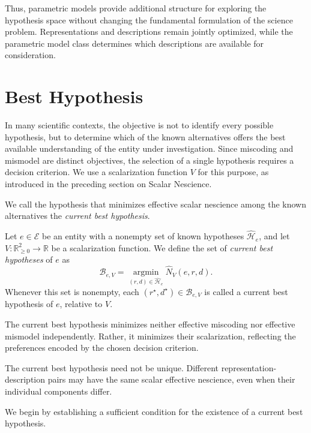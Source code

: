 Thus, parametric models provide additional structure for exploring the hypothesis space without changing the fundamental formulation of the science problem. Representations and descriptions remain jointly optimized, while the parametric model class determines which descriptions are available for consideration.

%
%

\section{Best Hypothesis}

In many scientific contexts, the objective is not to identify every possible hypothesis, but to determine
which of the known alternatives offers the best available understanding of the entity under investigation. Since miscoding and mismodel are distinct objectives, the selection of a single hypothesis requires a decision criterion. We use a scalarization function $V$ for this purpose, as introduced in the preceding section on Scalar Nescience.

We call the hypothesis that minimizes effective scalar nescience among the known alternatives the \emph{current best hypothesis}.

\begin{definition}
Let $e\in\mathcal E$ be an entity with a nonempty set of known hypotheses $\widehat{\mathcal H}_e$, and let $V:\mathbb R_{\geq0}^2\to\mathbb R$ be a scalarization function. We define the set of \emph{current best hypotheses}  of $e$ as
\[
\mathcal B_{e,V} = \operatorname*{argmin}_{ (r,d)\in\widehat{\mathcal H}_e} \widehat N_V(e,r,d).
\]
Whenever this set is nonempty, each $(r^\star,d^\star)\in\mathcal B_{e,V}$ is called a current best hypothesis of $e$, relative to $V$.
\end{definition}

The current best hypothesis minimizes neither effective miscoding nor effective mismodel independently. Rather, it minimizes their scalarization, reflecting the preferences encoded by the chosen decision criterion.

The current best hypothesis need not be unique. Different representation-description pairs may have the same scalar effective nescience, even when their individual components differ.

We begin by establishing a sufficient condition for the existence of a current best hypothesis.

